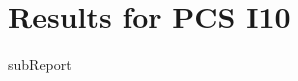 \renewcommand{\DTRPcs}{I10} %
\renewcommand{\DTRPcsLong}{I10}


    \section{Results for PCS \DTRPcsLong}

    {{subReport}}
    \newpage


